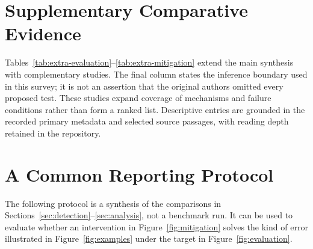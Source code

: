 \section{Supplementary Comparative Evidence}\label{app:comparisons}
Tables~\ref{tab:extra-evaluation}--\ref{tab:extra-mitigation} extend the main synthesis with complementary studies. The final column states the inference boundary used in this survey; it is not an assertion that the original authors omitted every proposed test. These studies expand coverage of mechanisms and failure conditions rather than form a ranked list. Descriptive entries are grounded in the recorded primary metadata and selected source passages, with reading depth retained in the repository.


\FloatBarrier
\section{A Common Reporting Protocol}\label{app:protocol}
The following protocol is a synthesis of the comparisons in Sections~\ref{sec:detection}--\ref{sec:analysis}, not a benchmark run. It can be used to evaluate whether an intervention in Figure~\ref{fig:mitigation} solves the kind of error illustrated in Figure~\ref{fig:examples} under the target in Figure~\ref{fig:evaluation}.

